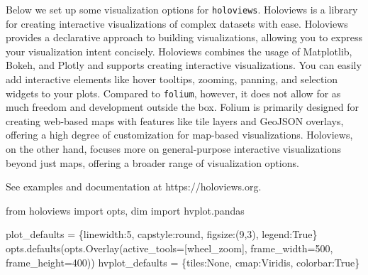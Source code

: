 \documentclass[
  letterpaper,
  DIV=11,
  numbers=noendperiod]{scrreprt}
\newenvironment{Shaded}{\begin{snugshade}}{\end{snugshade}}
\newcommand{\DecValTok}[1]{\textcolor[rgb]{0.68,0.00,0.00}{#1}}
\newcommand{\ImportTok}[1]{\textcolor[rgb]{0.00,0.46,0.62}{#1}}
\newcommand{\NormalTok}[1]{\textcolor[rgb]{0.00,0.23,0.31}{#1}}
\newcommand{\OperatorTok}[1]{\textcolor[rgb]{0.37,0.37,0.37}{#1}}
\newcommand{\StringTok}[1]{\textcolor[rgb]{0.13,0.47,0.30}{#1}}
\newcommand{\VariableTok}[1]{\textcolor[rgb]{0.07,0.07,0.07}{#1}}
\begin{document}
Below we set up some visualization options for \texttt{holoviews}.
Holoviews is a library for creating interactive visualizations of
complex datasets with ease. Holoviews provides a declarative approach to
building visualizations, allowing you to express your visualization
intent concisely. Holoviews combines the usage of Matplotlib, Bokeh, and
Plotly and supports creating interactive visualizations. You can easily
add interactive elements like hover tooltips, zooming, panning, and
selection widgets to your plots. Compared to \texttt{folium}, however,
it does not allow for as much freedom and development outside the box.
Folium is primarily designed for creating web-based maps with features
like tile layers and GeoJSON overlays, offering a high degree of
customization for map-based visualizations. Holoviews, on the other
hand, focuses more on general-purpose interactive visualizations beyond
just maps, offering a broader range of visualization options.

See examples and documentation at https://holoviews.org.

\begin{Shaded}
\begin{Highlighting}[]
\ImportTok{from}\NormalTok{ holoviews }\ImportTok{import}\NormalTok{ opts, dim}
\ImportTok{import}\NormalTok{ hvplot.pandas }

\NormalTok{plot\_defaults }\OperatorTok{=}\NormalTok{ \{}\StringTok{\textquotesingle{}linewidth\textquotesingle{}}\NormalTok{:}\DecValTok{5}\NormalTok{, }\StringTok{\textquotesingle{}capstyle\textquotesingle{}}\NormalTok{:}\StringTok{\textquotesingle{}round\textquotesingle{}}\NormalTok{, }\StringTok{\textquotesingle{}figsize\textquotesingle{}}\NormalTok{:(}\DecValTok{9}\NormalTok{,}\DecValTok{3}\NormalTok{), }\StringTok{\textquotesingle{}legend\textquotesingle{}}\NormalTok{:}\VariableTok{True}\NormalTok{\}}
\NormalTok{opts.defaults(opts.Overlay(active\_tools}\OperatorTok{=}\NormalTok{[}\StringTok{\textquotesingle{}wheel\_zoom\textquotesingle{}}\NormalTok{], frame\_width}\OperatorTok{=}\DecValTok{500}\NormalTok{, frame\_height}\OperatorTok{=}\DecValTok{400}\NormalTok{))}
\NormalTok{hvplot\_defaults }\OperatorTok{=}\NormalTok{ \{}\StringTok{\textquotesingle{}tiles\textquotesingle{}}\NormalTok{:}\VariableTok{None}\NormalTok{, }\StringTok{\textquotesingle{}cmap\textquotesingle{}}\NormalTok{:}\StringTok{\textquotesingle{}Viridis\textquotesingle{}}\NormalTok{, }\StringTok{\textquotesingle{}colorbar\textquotesingle{}}\NormalTok{:}\VariableTok{True}\NormalTok{\}}
\end{Highlighting}
\end{Shaded}
\end{document}
